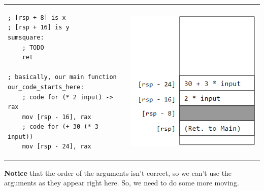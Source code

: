 \begin{center}
    \begin{tabular}{p{3in}|p{3in}}
        \begin{verbatim}
; [rsp + 8] is x 
; [rsp + 16] is y
sumsquare:
    ; TODO 
    ret 

; basically, our main function 
our_code_starts_here:
    ; code for (* 2 input) -> rax 
    mov [rsp - 16], rax 
    ; code for (+ 30 (* 3 input))
    mov [rsp - 24], rax\end{verbatim}
        & \begin{center}
            \includegraphics[scale=0.7]{assets/sumsq_arg_order1.png}
        \end{center}
    \end{tabular}
\end{center}

\textbf{Notice} that the order of the arguments isn't correct, so we can't use the arguments as they appear right here. So, we need to do some more moving.

